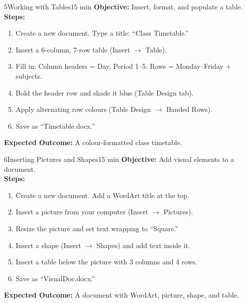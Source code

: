 \begin{labactivity}{5}{Working with Tables}{15 min}
\textbf{Objective:} Insert, format, and populate a table.\\[4pt]
\textbf{Steps:}
\begin{enumerate}[label=\protect\stepcircle{\arabic*}, leftmargin=2cm, itemsep=4pt]
  \item Create a new document. Type a title: ``Class Timetable.''
  \item Insert a 6-column, 7-row table (Insert $\rightarrow$ Table).
  \item Fill in: Column headers = Day, Period 1--5. Rows = Monday--Friday + subjects.
  \item Bold the header row and shade it blue (Table Design tab).
  \item Apply alternating row colours (Table Design $\rightarrow$ Banded Rows).
  \item Save as ``Timetable.docx.''
\end{enumerate}
\textbf{Expected Outcome:} A colour-formatted class timetable.
\welldone
\end{labactivity}

\begin{labactivity}{6}{Inserting Pictures and Shapes}{15 min}
\textbf{Objective:} Add visual elements to a document.\\[4pt]
\textbf{Steps:}
\begin{enumerate}[label=\protect\stepcircle{\arabic*}, leftmargin=2cm, itemsep=4pt]
  \item Create a new document. Add a WordArt title at the top.
  \item Insert a picture from your computer (Insert $\rightarrow$ Pictures).
  \item Resize the picture and set text wrapping to ``Square.''
  \item Insert a shape (Insert $\rightarrow$ Shapes) and add text inside it.
  \item Insert a table below the picture with 3 columns and 4 rows.
  \item Save as ``VisualDoc.docx.''
\end{enumerate}
\textbf{Expected Outcome:} A document with WordArt, picture, shape, and table.
\welldone
\end{labactivity}

